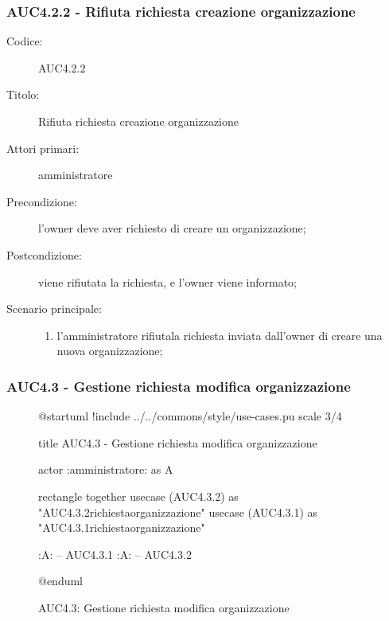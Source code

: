 \documentclass[casi-duso]{subfiles}
\begin{document}
\subsubsection{AUC4.2.2 - Rifiuta richiesta creazione organizzazione}%
\label{subsub:AUC4.2.2}
\begin{description}
  \item[Codice:] AUC4.2.2
  \item[Titolo:] Rifiuta richiesta creazione organizzazione
  \item[Attori primari:] amministratore
  \item[Precondizione:] l'owner deve aver richiesto di creare un organizzazione;
  \item[Postcondizione:] viene rifiutata la richiesta, e l'owner viene informato;
  \item[Scenario principale:]
  \begin{enumerate}
    \item  l'amministratore rifiutala richiesta inviata dall'owner di creare una nuova organizzazione;
  \end{enumerate}
\end{description}

\subsubsection{AUC4.3 - Gestione richiesta modifica organizzazione}%
\label{subsub:AUC4.3}

\begin{figure}[h!] 
  \centering 
  \begin{plantuml}
  @startuml
  !include ../../commons/style/use-cases.pu
  scale 3/4

  title AUC4.3 - Gestione richiesta modifica organizzazione

  actor :amministratore: as A

  rectangle {
    together {
      usecase (AUC4.3.2) as "AUC4.3.2\nRifiuta richiesta\nmodifica organizzazione"
      usecase (AUC4.3.1) as "AUC4.3.1\nAccetta richiesta\nmodifica organizzazione"
    }
  }

  :A: -- AUC4.3.1
  :A: -- AUC4.3.2

  @enduml
  \end{plantuml} 
  \caption{AUC4.3: Gestione richiesta modifica organizzazione} 
  \label{fig:auc4_3} 
\end{figure}
\end{document}
